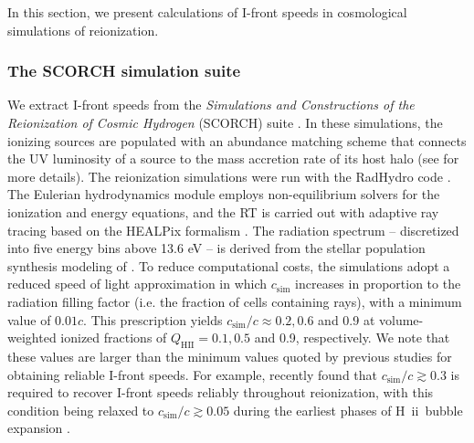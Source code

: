 \documentclass[twocolumn]{aastex62}
\newcommand{\HII}{H{\sc~ii}}
\begin{document}
In this section, we present calculations of I-front speeds in cosmological simulations of reionization.  

\subsubsection{The SCORCH simulation suite}

We extract I-front speeds from the  {\it Simulations and Constructions of the Reionization of Cosmic Hydrogen} ({SCORCH}) suite \citep{2015ApJ...813...54T, 2016arXiv160503970P, 2017arXiv171204464D}.  In these simulations, the ionizing sources are populated with an abundance matching scheme that connects the UV luminosity of a source to the mass accretion rate of its host halo (see \citealt{2015ApJ...813...54T} for more details).  The reionization simulations were run with the RadHydro code \citep{2004NewA....9..443T, 2007ApJ...671....1T,2008ApJ...689L..81T}.  The Eulerian hydrodynamics module employs non-equilibrium solvers for the ionization and energy equations, and the RT is carried out with adaptive ray tracing based on the HEALPix formalism \citep{2005ApJ...622..759G}.  The radiation spectrum -- discretized into five energy bins above 13.6 eV -- is derived from the stellar population synthesis modeling of \citet{2003MNRAS.344.1000B}.    To reduce computational costs, the simulations adopt a reduced speed of light approximation in which $c_{\mathrm{sim}}$ increases in proportion to the radiation filling factor (i.e. the fraction of cells containing rays), with a minimum value of $0.01c$.  This prescription yields $c_{\mathrm{sim}}/c\approx0.2,0.6$ and 0.9 at volume-weighted ionized fractions of $Q_{\mathrm{HII}} = 0.1, 0.5$ and 0.9, respectively.   We note that these values are larger than the minimum values quoted by previous studies for obtaining reliable I-front speeds.  For example, \citet{2018arXiv180301634D} recently found that $c_{\mathrm{sim}}/c \gtrsim 0.3$ is required to recover I-front speeds reliably throughout reionization, with this condition being relaxed to $c_{\mathrm{sim}}/c \gtrsim 0.05$ during the earliest phases of \HII\ bubble expansion \citep[see also][]{2016ApJ...833...66G}.      
\end{document}
